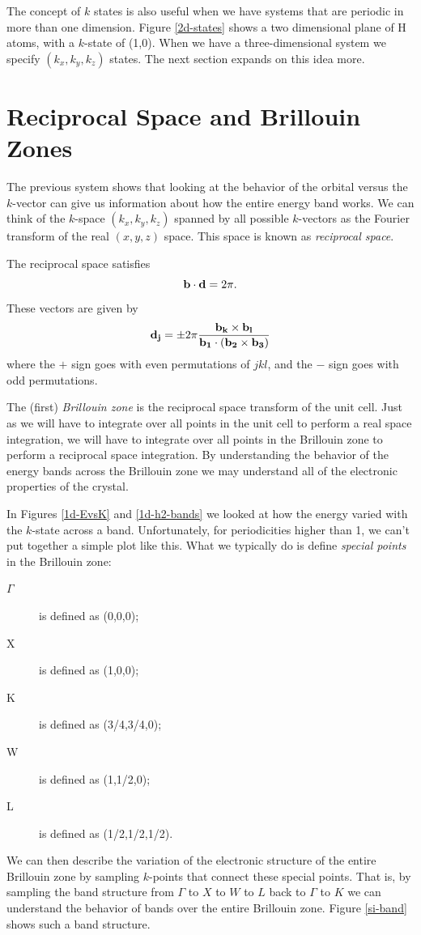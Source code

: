 The concept of $k$ states is also useful when we have systems that are
periodic in more than one dimension. Figure \ref{2d-states} shows a
two dimensional plane of H atoms, with a $k$-state of (1,0). When we
have a three-dimensional system we specify $(k_x, k_y, k_z)$
states. The next section expands on this idea more.

\section{Reciprocal Space and Brillouin Zones}
The previous system shows that looking at the behavior of the orbital
versus the $k$-vector can give us information about how the entire
energy band works. We can think of the $k$-space $(k_x,k_y,k_z)$
spanned by all possible $k$-vectors as the Fourier transform of the
real $(x,y,z)$ space. This space is known as \emph{reciprocal space}.

The reciprocal space  satisfies
\begin{equation}
 \mathbf{b}\cdot\mathbf{d}=2\pi.
\end{equation}
These vectors are given by
\begin{equation}
 \mathbf{d_j} = \pm2\pi\frac{\mathbf{b_k}\times\mathbf{b_l}}
                {\mathbf{b_1}\cdot(\mathbf{b_2}\times\mathbf{b_3})}
\end{equation}
where the $+$ sign goes with even permutations of $jkl$, and the $-$
sign goes with odd permutations.

The (first) \emph{Brillouin zone} is the reciprocal space
transform of the unit cell. Just as we will have to integrate over all
points in the unit cell to perform a real space integration, we will
have to integrate over all points in the Brillouin zone to perform a
reciprocal space integration. By understanding the behavior of the
energy bands across the Brillouin zone we may understand all of the
electronic properties of the crystal.

In Figures \ref{1d-EvsK} and \ref{1d-h2-bands} we looked at how the
energy varied with the $k$-state across a band. Unfortunately, for
periodicities higher than 1, we can't put together a simple plot like
this. What we typically do is define \emph{special points} in the
Brillouin zone:
\begin{description} 
\item[$\Gamma$] is defined as (0,0,0); 
\item[X] is defined as (1,0,0); 
\item[K] is defined as (3/4,3/4,0);
\item[W] is defined as (1,1/2,0);
\item[L] is defined as (1/2,1/2,1/2).
\end{description}
We can then describe the variation of the electronic structure of the
entire Brillouin zone by sampling $k$-points that connect these
special points. That is, by sampling the band
structure from $\Gamma$ to $X$ to $W$ to $L$ back to $\Gamma$ to $K$
we can understand the behavior of bands over the entire Brillouin
zone. Figure \ref{si-band} shows such a band structure.

